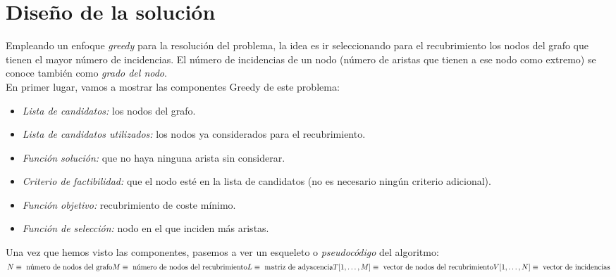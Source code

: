 \documentclass[11pt]{article}
\begin{document}
\section*{Diseño de la solución}

Empleando un enfoque \textit{greedy} para la resolución del problema, la idea es ir seleccionando para el recubrimiento los nodos del grafo que tienen el mayor número de incidencias. El número de incidencias de un nodo (número de aristas que tienen a ese nodo como extremo) se conoce también como \textit{grado del nodo}. \\

En primer lugar, vamos a mostrar las componentes Greedy de este problema:

\begin{itemize}
	\item \textit{Lista de candidatos:} los nodos del grafo.
	\item \textit{Lista de candidatos utilizados:} los nodos ya considerados para el recubrimiento.
	\item \textit{Función solución:} que no haya ninguna arista sin considerar.
	\item \textit{Criterio de factibilidad:} que el nodo esté en la lista de candidatos (no es necesario ningún criterio adicional).
	\item \textit{Función objetivo:} recubrimiento de coste mínimo.
	\item \textit{Función de selección:} nodo en el que inciden más aristas.
\end{itemize}

Una vez que hemos visto las componentes, pasemos a ver un esqueleto o \textit{pseudocódigo} del algoritmo: \\

$N \equiv \text{ número de nodos del grafo}\\ M \equiv \text{ número de nodos del recubrimiento}\\ L \equiv \text{ matriz de adyacencia}\\ T[1,\dots,M] \equiv \text{ vector de nodos del recubrimiento}\\ V[1,\dots,N] \equiv \text{ vector de incidencias}$\\
\end{document}
